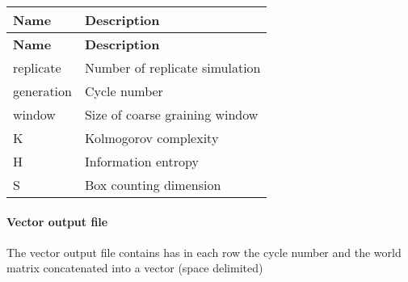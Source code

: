 \tabulinesep=1mm
\begin{longtabu} spread 0pt [c]{*{2}{|X[-1]}|}
\hline
\rowcolor{\tableheadbgcolor}\textbf{ Name }&\textbf{ Description  }\\
\endfirsthead
\hline
\endfoot
\hline
\rowcolor{\tableheadbgcolor}\textbf{ Name }&\textbf{ Description  }\\
\endhead
replicate &Number of replicate simulation \\
generation&Cycle number \\
window &Size of coarse graining window \\
K &Kolmogorov complexity \\
H &Information entropy \\
S &Box counting dimension \\
\end{longtabu}
\paragraph*{Vector output file}

The vector output file contains has in each row the cycle number and the world matrix concatenated into a vector (space delimited) 